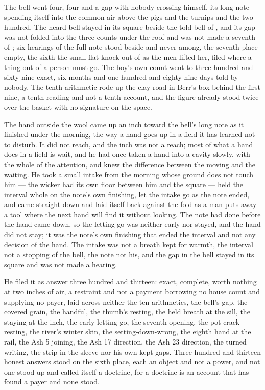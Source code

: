 \scenebreak

The bell went four, four and a gap with nobody crossing himself, its long note spending itself into the common air above the pigs and the turnips and the two hundred. The heard bell stayed in its square beside the told bell of , and its gap was not folded into the three counts under the roof and was not made a seventh of ; six hearings of the full note stood beside and never among, the seventh place empty, the sixth the small flat knock out of  as the men lifted her, filed where a thing out of a person must go. The boy's own count went to three hundred and sixty-nine exact, six months and one hundred and eighty-nine days told by nobody. The tenth arithmetic rode up the clay road in Berr's box behind the first nine, a tenth reading and not a tenth account, and the figure already stood twice over the basket with no signature on the space.

The hand outside the wool came up an inch toward the bell's long note as it finished under the morning, the way a hand goes up in a field it has learned not to disturb. It did not reach, and the inch was not a reach; most of what a hand does in a field is wait, and he had once taken a hand into a cavity slowly, with the whole of the attention, and knew the difference between the moving and the waiting. He took a small intake from the morning whose ground does not touch him --- the wicker had its own floor between him and the square --- held the interval whole on the note's own finishing, let the intake go as the note ended, and came straight down and laid itself back against the fold as a man puts away a tool where the next hand will find it without looking. The note had done before the hand came down, so the letting-go was neither early nor stayed, and the hand did not stay; it was the note's own finishing that ended the interval and not any decision of the hand. The intake was not a breath kept for warmth, the interval not a stopping of the bell, the note not his, and the gap in the bell stayed in its square and was not made a hearing.

He filed it as answer three hundred and thirteen: exact, complete, worth nothing at two inches of air, a restraint and not a payment borrowing no house count and supplying no payer, laid across neither the ten arithmetics, the bell's gap, the covered grain, the handful, the thumb's resting, the held breath at the sill, the staying at the inch, the early letting-go, the seventh opening, the pot-crack resting, the river's winter skin, the setting-down-wrong, the eighth hand at the rail, the Ash 5 joining, the Ash 17 direction, the Ash 23 direction, the turned writing, the strip in the sleeve nor his own kept gaps. Three hundred and thirteen honest answers stood on the sixth place, each an object and not a power, and not one stood up and called itself a doctrine, for a doctrine is an account that has found a payer and none stood.

